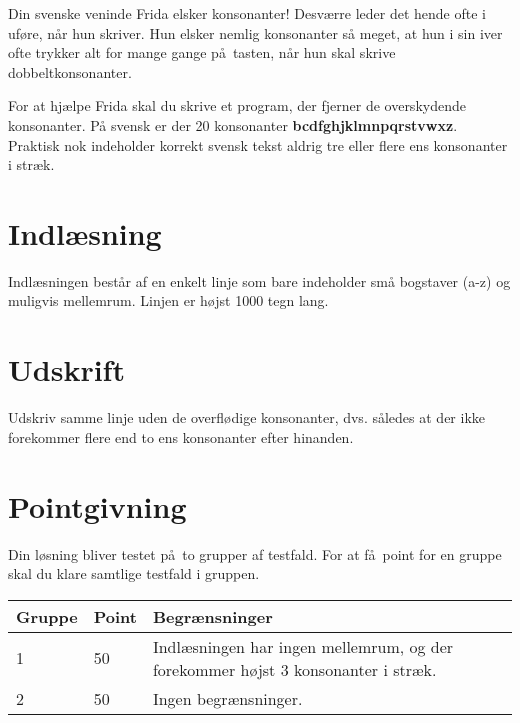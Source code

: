 Din svenske veninde Frida elsker konsonanter!
Desværre leder det hende ofte i uføre, når hun skriver.
Hun elsker nemlig konsonanter så meget, at hun i sin iver ofte trykker alt for mange gange på tasten, når hun skal skrive dobbeltkonsonanter.

For at hjælpe Frida skal du skrive et program, der fjerner de overskydende konsonanter.
På svensk er der 20 konsonanter
\textbf{bcdfghjklmnpqrstvwxz}.
Praktisk nok indeholder korrekt svensk tekst aldrig tre eller flere ens konsonanter i stræk.

\section*{Indlæsning}
Indlæsningen består af en enkelt linje som bare indeholder små bogstaver (a-z) og muligvis mellemrum. 
Linjen er højst 1000 tegn lang.

\section*{Udskrift}
Udskriv samme linje uden de overflødige konsonanter, dvs. således at der ikke forekommer flere end to ens konsonanter efter hinanden.

\section*{Pointgivning}

Din løsning bliver testet på to grupper af testfald.
For at få point for en gruppe skal du klare samtlige testfald i gruppen.

\noindent
\begin{tabular}{| l | l | l |}
\hline
Gruppe & Point & Begrænsninger \\ \hline
1     & 50          &  Indlæsningen har ingen mellemrum, og der forekommer højst 3 konsonanter i stræk.\\ \hline
2     & 50         &  Ingen begrænsninger. \\ \hline
\end{tabular}

